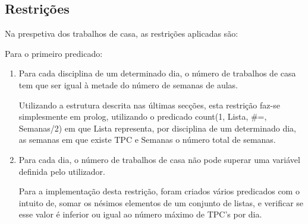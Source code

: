 \documentclass{llncs}
\begin{document}
\subsection{Restrições}

Na prespetiva dos trabalhos de casa, as restrições aplicadas são:

Para o primeiro predicado:
\begin{enumerate}
\item Para cada disciplina de um determinado dia, o número de trabalhos de casa tem que ser igual à metade do número de semanas de aulas.

Utilizando a estrutura descrita nas últimas secções, esta restrição faz-se simplesmente em prolog, utilizando o predicado count(1, Lista, \#=, Semanas/2) em que Lista representa, por disciplina de um determinado dia, as semanas em que existe TPC e Semanas o número total de semanas.

\item Para cada dia, o número de trabalhos de casa não pode superar uma variável definida pelo utilizador.

Para a implementação desta restrição, foram criados vários predicados com o intuito de, somar os nésimos elementos de um conjunto de listas, e verificar se esse valor é inferior ou igual ao número máximo de TPC's por dia.
\end{enumerate}
\end{document}
